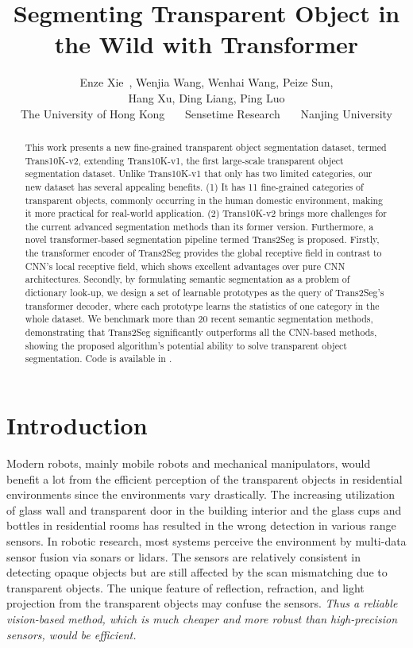 \documentclass{article}
\title{Segmenting Transparent Object in the Wild with Transformer}
\author{
    Enze Xie\ ,
    Wenjia Wang,
    Wenhai Wang, 
    Peize Sun, \\
    Hang Xu,
    Ding Liang, 
    Ping Luo \\
    \affiliations 
    The University of Hong Kong~~~
    Sensetime Research~~~
    Nanjing University
    \\
}
\begin{document}
\maketitle

\begin{abstract}
This work presents a new fine-grained transparent object segmentation dataset, termed Trans10K-v2, extending Trans10K-v1, the first large-scale transparent object segmentation dataset. 
Unlike Trans10K-v1 that only has two limited categories, our new dataset has several appealing benefits. (1) It has 11 fine-grained categories of transparent objects, commonly occurring in the human domestic environment, making it more practical for real-world application. 
(2) Trans10K-v2 brings more challenges for the current advanced segmentation methods than its former version.
Furthermore, a novel transformer-based segmentation pipeline termed Trans2Seg is proposed.
Firstly, the transformer encoder of Trans2Seg provides the global receptive field in contrast to CNN's local receptive field, which shows excellent advantages over pure CNN architectures.
Secondly, by formulating semantic segmentation as a problem of dictionary look-up, we design a set of learnable prototypes as the query of Trans2Seg's transformer decoder, where each prototype learns the statistics of one category in the whole dataset.
We benchmark more than 20 recent semantic segmentation methods, demonstrating that Trans2Seg significantly outperforms all the CNN-based methods, showing the proposed algorithm's potential ability to solve transparent object segmentation.
Code is available in \href{https://github.com/xieenze/Trans2Seg}{\color{blue}{\tt github.com/xieenze/Trans2Seg}}.
\end{abstract}

\section{Introduction}
Modern robots, mainly mobile robots and mechanical manipulators, would benefit a lot from the efficient perception of the transparent objects in residential environments since the environments vary drastically. The increasing utilization of glass wall and transparent door in the building interior and the glass cups and bottles in residential rooms has resulted in the wrong detection in various range sensors.
In robotic research, most systems perceive the environment by multi-data sensor fusion via sonars or lidars. The sensors are relatively consistent in detecting opaque objects but are still affected by the scan mismatching due to transparent objects. The unique feature of reflection, refraction, and light projection from the transparent objects may confuse the sensors. \textit{Thus a reliable vision-based method, which is much cheaper and more robust than high-precision sensors, would be efficient.}
\end{document}
